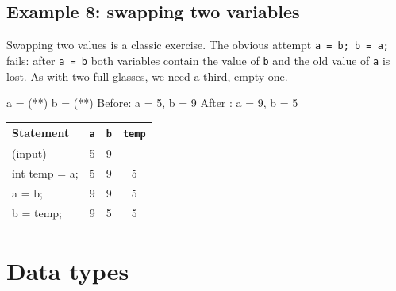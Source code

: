 \subsection{Example 8: swapping two variables}
Swapping two values is a classic exercise. The obvious attempt \texttt{a = b; b = a;} fails: after \texttt{a = b} both variables contain the value of \texttt{b} and the old value of \texttt{a} is lost. As with two full glasses, we need a third, empty one.

\begin{center}
\begin{minipage}[c]{0.45\linewidth}
\begin{consolebox}
\begin{run}
a = (**)
b = (**)
Before: a = 5, b = 9
After : a = 9, b = 5
\end{run}
\end{consolebox}
\end{minipage}\hfill
\begin{minipage}[c]{0.5\linewidth}\centering\small
\begin{tabular}{>{\ttfamily}lccc}
\toprule
\normalfont Statement & \texttt{a} & \texttt{b} & \texttt{temp}\\ \midrule
\normalfont(input) & 5 & 9 & --\\
int temp = a; & 5 & 9 & 5\\
a = b; & 9 & 9 & 5\\
b = temp; & 9 & 5 & 5\\ \bottomrule
\end{tabular}
\end{minipage}
\end{center}

\section{Data types}\label{sec:types}

